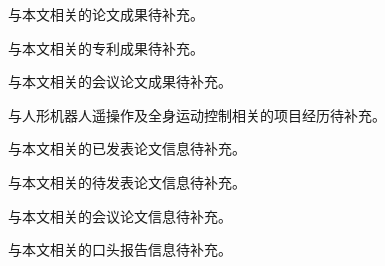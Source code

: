 
\begin{achievements}

  \begin{theachievements}[已发表论文]
    \item 与本文相关的论文成果待补充。
  \end{theachievements}

  \begin{theachievements}[发明专利]
    \item 与本文相关的专利成果待补充。
  \end{theachievements}

  \begin{theachievements}[会议论文]
    \item 与本文相关的会议论文成果待补充。
  \end{theachievements}

  \begin{theachievements}[参与的科研项目]
    \item 与人形机器人遥操作及全身运动控制相关的项目经历待补充。
  \end{theachievements}

\end{achievements}


\begin{achievements*}

  \begin{theachievements}[已发表论文]
    \item 与本文相关的已发表论文信息待补充。
  \end{theachievements}

  \begin{theachievements}[待发表期刊论文]
    \item 与本文相关的待发表论文信息待补充。
  \end{theachievements}

  \begin{theachievements}[会议论文]
    \item 与本文相关的会议论文信息待补充。
  \end{theachievements}

  \begin{theachievements}[口头报告]
    \item 与本文相关的口头报告信息待补充。
  \end{theachievements}

\end{achievements*}
